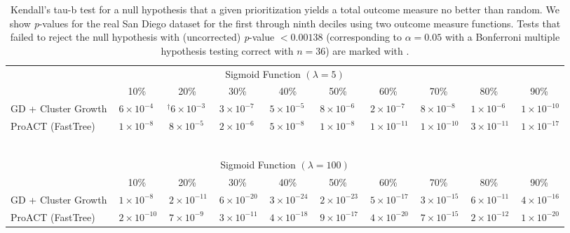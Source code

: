 \documentclass[a4paper,11pt]{article}
\begin{document}
\begin{table}[!h]
\caption{Kendall's tau-b test for a null hypothesis that a given prioritization yields a total outcome measure no better than random. We show \textit{p}-values for the real San Diego dataset for the first through ninth deciles using two outcome measure functions. 
Tests that failed to reject the null hypothesis with (uncorrected) \textit{p}-value $< 0.00138$ (corresponding to $\alpha=0.05$ with a Bonferroni multiple hypothesis testing correct with $n=36$) are marked with \dag.\label{tab:tautest-sup}}
\footnotesize
\centering
\hspace{-1.5cm}
{\tabcolsep=0pt\begin{tabular*}{\textwidth}{@{\extracolsep{\fill}}llllllllll@{}}\toprule
\multicolumn{10}{c}{Sigmoid Function $(\lambda=5)$}\\
& \multicolumn{1}{c}{10\%} & \multicolumn{1}{c}{20\%} & \multicolumn{1}{c}{30\%} & \multicolumn{1}{c}{40\%} & \multicolumn{1}{c}{50\%} & \multicolumn{1}{c}{60\%} & \multicolumn{1}{c}{70\%} & \multicolumn{1}{c}{80\%} & \multicolumn{1}{c}{90\%}\\
\midrule
GD + Cluster Growth & $^{\ }6\times10^{-4}$ & $^\dag6\times10^{-3}$ & $^{\ }3\times10^{-7}$ & $^{\ }5\times10^{-5}$ & $^{\ }8\times10^{-6}$ & $^{\ }2\times10^{-7}$ & $^{\ }8\times10^{-8}$ & $^{\ }1\times10^{-6}$ & $^{\ }1\times10^{-10}$\\
ProACT (FastTree) & $^{\ }1\times10^{-8}$ & $^{\ }8\times10^{-5}$ & $^{\ }2\times10^{-6}$ & $^{\ }5\times10^{-8}$ & $^{\ }1\times10^{-8}$ & $^{\ }1\times10^{-11}$ & $^{\ }1\times10^{-10}$ & $^{\ }3\times10^{-11}$ & $^{\ }1\times10^{-17}$\\
\midrule\\~\\[-1em]
\multicolumn{10}{c}{Sigmoid Function $(\lambda=100)$}\\
& \multicolumn{1}{c}{10\%} & \multicolumn{1}{c}{20\%} & \multicolumn{1}{c}{30\%} & \multicolumn{1}{c}{40\%} & \multicolumn{1}{c}{50\%} & \multicolumn{1}{c}{60\%} & \multicolumn{1}{c}{70\%} & \multicolumn{1}{c}{80\%} & \multicolumn{1}{c}{90\%}\\
\midrule
GD + Cluster Growth & $^{\ }1\times10^{-8}$ & $^{\ }2\times10^{-11}$ & $^{\ }6\times10^{-20}$ & $^{\ }3\times10^{-24}$ & $^{\ }2\times10^{-23}$ & $^{\ }5\times10^{-17}$ & $^{\ }3\times10^{-15}$ & $^{\ }6\times10^{-11}$ & $^{\ }4\times10^{-16}$\\
ProACT (FastTree) & $^{\ }2\times10^{-10}$ & $^{\ }7\times10^{-9}$ & $^{\ }3\times10^{-11}$ & $^{\ }4\times10^{-18}$ & $^{\ }9\times10^{-17}$ & $^{\ }4\times10^{-20}$ & $^{\ }7\times10^{-15}$ & $^{\ }2\times10^{-12}$ & $^{\ }1\times10^{-20}$\\

\end{tabular*}}
\end{table}
\end{document}
